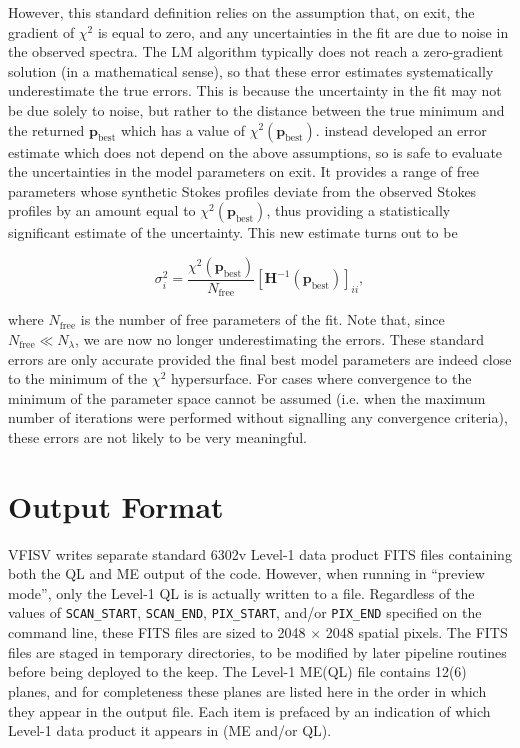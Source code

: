 \documentclass[11pt]{article}
\begin{document}
However, this standard definition relies on the assumption that, on exit, the gradient of $\chi^{2}$ is equal to
zero, and any uncertainties in the fit are due to noise in the observed spectra.  The LM algorithm typically does
not reach a zero-gradient solution (in a mathematical sense), so that these error estimates systematically
underestimate the true errors.  This is because the uncertainty in the fit may not be due solely to noise, but 
rather to the distance between the true minimum and the returned $\mathbf{p}_{\mathrm{best}}$ which has a 
value of $\chi^{2}({\mathbf{p}_{\mathrm{best}}})$.  \citet{sanchezalmeida:1997} instead developed an error estimate
which does not depend on the above assumptions, so is safe to evaluate the uncertainties in the model parameters
on exit.  It provides a range of free parameters whose synthetic Stokes profiles deviate from the observed
Stokes profiles by an amount equal to $\chi^{2}({\mathbf{p}_{\mathrm{best}}})$, thus providing a statistically
significant estimate of the uncertainty.  This new estimate turns out to be

\begin{equation}
\sigma_{i}^{2} = \frac{\chi^{2}(\mathbf{p}_{\mathrm{best}})}{N_{\mathrm{free}}}\left[\mathbf{H}^{-1}(\mathbf{p}_{\mathrm{best}})\right]_{ii},
\end{equation}

where $N_{\mathrm{free}}$ is the number of free parameters of the fit.  Note that, since $N_{\mathrm{free}} \ll N_{\lambda}$, we
are now no longer underestimating the errors.  These standard errors are only accurate
provided the final best model parameters are indeed close to the minimum of the $\chi^{2}$ hypersurface.
For cases where convergence to the minimum of the parameter space cannot be assumed (i.e. when the maximum
number of iterations were performed without signalling any convergence criteria), these errors are not
likely to be very meaningful.



\clearpage
\section{Output Format}\label{ch:output}

VFISV writes separate standard \solisvsm 6302v Level-1 data product FITS files containing both the
QL and ME output of the code.  However, when running in ``preview mode'', only the Level-1 QL is
is actually written to a file.  Regardless of the values of \texttt{SCAN\_START}, \texttt{SCAN\_END},
\texttt{PIX\_START}, and/or \texttt{PIX\_END} specified on the command line, these FITS files are
sized to 2048 $\times$ 2048 spatial pixels.  The FITS files are staged in temporary directories, to
be modified by later pipeline routines before being deployed to the keep.  The Level-1 ME(QL) file
contains 12(6) planes, and for completeness these planes are listed here in the order in which they
appear in the output file.  Each item is prefaced by an indication of which Level-1 data product it
appears in (ME and/or QL).
\end{document}
